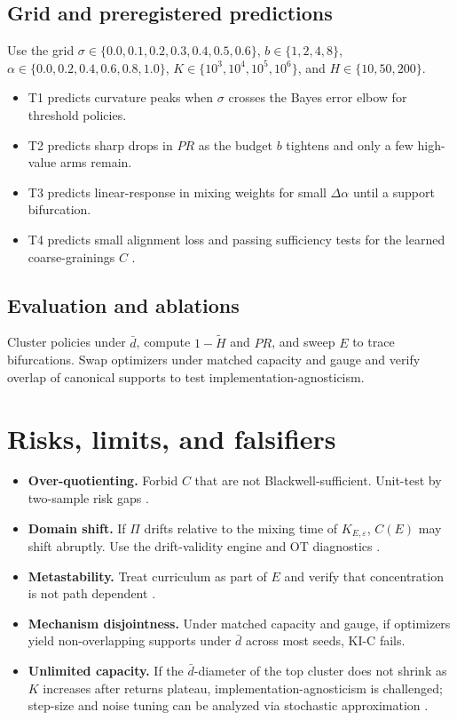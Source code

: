 \documentclass[11pt]{article}
\newcommand{\1}{\mathbbm{1}}
\begin{document}
\subsection{Grid and preregistered predictions}
Use the grid $\sigma \in \{0.0, 0.1, 0.2, 0.3, 0.4, 0.5, 0.6\}$, $b \in \{1,2,4,8\}$, $\alpha \in \{0.0, 0.2, 0.4, 0.6, 0.8, 1.0\}$, $K \in \{10^3,10^4,10^5,10^6\}$, and $H \in \{10,50,200\}$. 
\begin{itemize}[leftmargin=2em]
    \item T1 predicts curvature peaks when $\sigma$ crosses the Bayes error elbow for threshold policies.
    \item T2 predicts sharp drops in $PR$ as the budget $b$ tightens and only a few high-value arms remain.
    \item T3 predicts linear-response in mixing weights for small $\Delta \alpha$ until a support bifurcation.
    \item T4 predicts small alignment loss and passing sufficiency tests for the learned coarse-grainings $C$ \parencite{Blackwell1953}.
\end{itemize}

\subsection{Evaluation and ablations}
Cluster policies under $\bar d$, compute $1 - \tilde H$ and $PR$, and sweep $E$ to trace bifurcations. Swap optimizers under matched capacity and gauge and verify overlap of canonical supports to test implementation-agnosticism.

\section{Risks, limits, and falsifiers}
\begin{itemize}[leftmargin=2em]
    \item \textbf{Over-quotienting.} Forbid $C$ that are not Blackwell-sufficient. Unit-test by two-sample risk gaps \parencite{Blackwell1953}.
    \item \textbf{Domain shift.} If $\Pi$ drifts relative to the mixing time of $K_{E,\varepsilon}$, $C(E)$ may shift abruptly. Use the drift-validity engine and OT diagnostics \parencite{Villani2009}.
    \item \textbf{Metastability.} Treat curriculum as part of $E$ and verify that concentration is not path dependent \parencite{Young1993,Kandori1993}.
    \item \textbf{Mechanism disjointness.} Under matched capacity and gauge, if optimizers yield non-overlapping supports under $\bar d$ across most seeds, KI-C fails.
    \item \textbf{Unlimited capacity.} If the $\bar d$-diameter of the top cluster does not shrink as $K$ increases after returns plateau, implementation-agnosticism is challenged; step-size and noise tuning can be analyzed via stochastic approximation \parencite{Borkar2008}.
\end{itemize}
\end{document}
